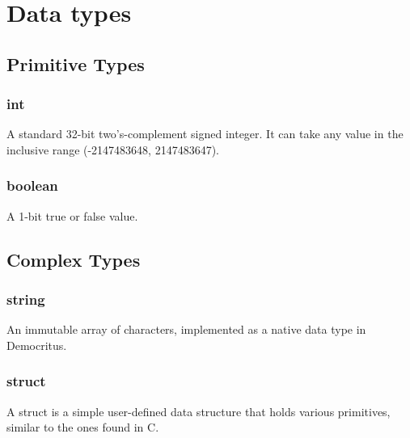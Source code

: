 \section{Data types}
    \subsection{Primitive Types}
        \subsubsection{int}
            A standard 32-bit two's-complement signed integer. It can take any value in the inclusive range (-2147483648, 2147483647).
        \iffalse\subsubsection{float}
            A 64-bit floating precision number, represnted in the IEEE 754 format.            
        \subsubsection{char}
            An 8-bit ASCII character. We include the extended ASCII set, so we use all 256 possible values.\fi
        \subsubsection{boolean}
            A 1-bit true or false value.
        \iffalse\subsubsection{pointer}
            A 64-bit pointer that holds the value to a location in memory; pointers may be passed and dereferenced.\fi
    \subsection{Complex Types}
         \iffalse\subsubsection{Array}
            A fixed-size array, allocated on the stack and containing other primitive types. The size must be defined at declaration. An array object can be accessed by standard bracket notation, i.e. \texttt{list1[0]}.\fi
        \subsubsection{string}
            An immutable array of characters, implemented as a native data type in Democritus.
       \subsubsection{struct}
            A struct is a simple user-defined data structure that holds various primitives, similar to the ones found in C. 

